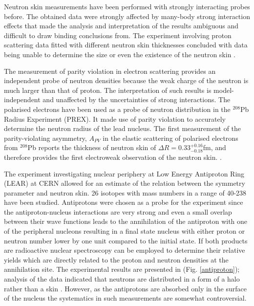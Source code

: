 \indent Neutron skin measurements have been performed with strongly interacting probes before. The obtained data were strongly affected by many-body strong interaction effects that made the analysis and interpretation of the results ambiguous and difficult to draw binding conclusions from. The experiment involving proton scattering data fitted with different neutron skin thicknesses concluded with data being unable to determine the size or even the existence of the neutron skin \cite{piek}.

\indent The measurement of parity violation in electron scattering provides an independent probe of neutron densities because the weak charge of the neutron is much larger than that of proton. The interpretation of such results is model-independent and unaffected by the uncertainties of strong interactions. The polarised electrons have been used as a probe of neutron distribution in the $^{208}$Pb Radius Experiment (PREX). It made use of parity violation to accurately determine the neutron radius of the lead nucleus. The first measurement of the parity-violating asymmetry, $A_{PV}$ in the elastic scattering of polarised electrons from $^{208}$Pb reports the thickness of neutron skin of $\Delta R = 0.33_{-0.18}^{+0.16}$fm, and therefore provides the first electroweak observation of the neutron skin. \cite{prex}.

\indent The experiment investigating nuclear periphery at Low Energy Antiproton Ring (LEAR) at CERN allowed for an estimate of the relation between the symmetry parameter and neutron skin. 26 isotopes with mass numbers in a range of 40-238 have been studied. Antiprotons were chosen as a probe for the experiment since the antiproton-nucleus interactions are very strong and even a small overlap between their wave functions leads to the annihilation of the antiproton with one of the peripheral nucleons resulting in a final state nucleus with either proton or neutron number lower by one unit compared to the initial state. If both products are radioactive nuclear spectroscopy can be employed to determine their relative yields which are directly related to the proton and neutron densities at the annihilation site. The experimental results are presented in (Fig. \ref{antiproton}); analysis of the data indicated that neutrons are distributed in a form of a halo rather than a skin \cite{trzcina}. However, as the antiprotons are absorbed only in the surface of the nucleus the systematics in such measurements are somewhat controversial.

